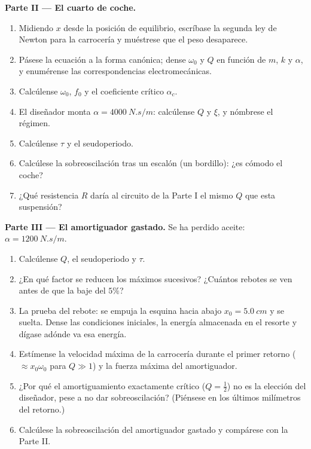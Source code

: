 \begin{problem}
\medskip
\noindent\textbf{Parte II --- El cuarto de coche.}
\begin{enumerate}[resume]
  \item Midiendo $x$ desde la posición de equilibrio, escríbase la segunda
        ley de Newton para la carrocería y muéstrese que el peso
        desaparece.
  \item Pásese la ecuación a la forma canónica; dense $\omega_0$ y $Q$ en
        función de $m$, $k$ y $\alpha$, y enumérense las correspondencias
        electromecánicas.
  \item Calcúlense $\omega_0$, $f_0$ y el coeficiente crítico
        $\alpha_c$.
  \item El diseñador monta $\alpha = \qty{4000}{N.s/m}$: calcúlense $Q$ y
        $\xi$, y nómbrese el régimen.
  \item Calcúlense $\tau$ y el seudoperiodo.
  \item Calcúlese la sobreoscilación tras un escalón (un bordillo): ¿es
        cómodo el coche?
  \item ¿Qué resistencia $R$ daría al circuito de la Parte I el mismo $Q$
        que esta suspensión?
\end{enumerate}

\medskip
\noindent\textbf{Parte III --- El amortiguador gastado.}
Se ha perdido aceite: $\alpha = \qty{1200}{N.s/m}$.
\begin{enumerate}[resume]
  \item Calcúlense $Q$, el seudoperiodo y $\tau$.
  \item ¿En qué factor se reducen los máximos sucesivos? ¿Cuántos rebotes
        se ven antes de que la  baje del $5\%$?
  \item La prueba del rebote: se empuja la esquina hacia abajo $x_0 =
        \qty{5.0}{cm}$ y se suelta. Dense las condiciones iniciales, la
        energía almacenada en el resorte y dígase adónde va esa energía.
  \item Estímense la velocidad máxima de la carrocería durante el primer
        retorno ($\approx x_0\omega_0$ para $Q \gg 1$) y la fuerza máxima
        del amortiguador.
  \item ¿Por qué el amortiguamiento exactamente crítico ($Q = \tfrac12$)
        no es la elección del diseñador, pese a no dar sobreoscilación?
        (Piénsese en los últimos milímetros del retorno.)
  \item Calcúlese la sobreoscilación del amortiguador gastado y compárese
        con la Parte II.
\end{enumerate}


\end{problem}
